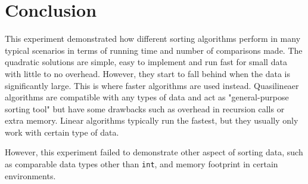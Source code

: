 \documentclass{article}
\begin{document}
\pagebreak


\section{Conclusion}

This experiment demonstrated how different sorting algorithms perform in many typical scenarios in terms of running time and number of comparisons made. The quadratic solutions are simple, easy to implement and run fast for small data with little to no overhead. However, they start to fall behind when the data is significantly large. This is where faster algorithms are used instead. Quasilineaer algorithms are compatible with any types of data and act as "general-purpose sorting tool" but have some drawbacks such as overhead in recursion calls or extra memory. Linear algorithms typically run the fastest, but they usually only work with certain type of data.

However, this experiment failed to demonstrate other aspect of sorting data, such as comparable data types other than \texttt{int}, and memory footprint in certain environments.
\end{document}
